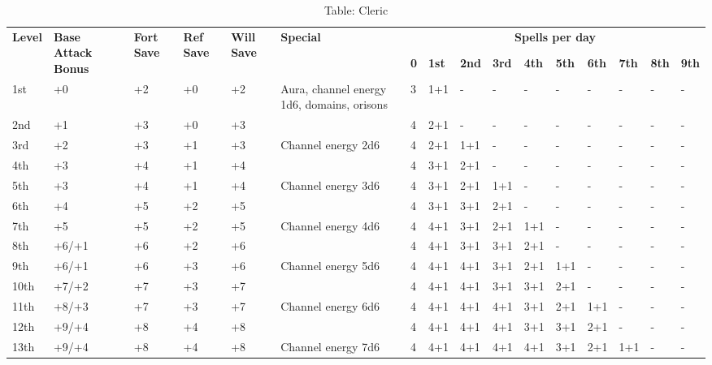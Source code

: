 \begin{table*}[]
\caption{Table: Cleric}
\sffamily
\setlength{\tabcolsep}{1pt}
\begin{tabularx}{\linewidth}{lp{6em}p{2.5em}p{2.5em}p{2.5em}Xllllllllll}
\multirow{2}{*}{\textbf{Level}} & \multirow{2}{*}{\parbox{5em}{\textbf{Base Attack Bonus}}} & \multirow{2}{*}{\parbox{1.5em}{\textbf{Fort Save}}} & \multirow{2}{*}{\parbox{1.5em}{\textbf{Ref Save}}} & \multirow{2}{*}{\parbox{1.5em}{\textbf{Will Save}}} & \textbf{Special} & \multicolumn{10}{c}{\textbf{Spells per day}} \\
                       &                                    &                            &                           &                            &                                                                                                  &  \textbf{0} & \textbf{1st} & \textbf{2nd} & \textbf{3rd} & \textbf{4th} & \textbf{5th} & \textbf{6th} & \textbf{7th} & \textbf{8th} & \textbf{9th} \\
1st & +0 & +2 & +0 & +2 & Aura, channel energy 1d6, domains, orisons & 3 & 1+1 & - & - & - & - & - & - & - & -\\
2nd & +1 & +3 & +0 & +3 &  & 4 & 2+1 & - & - & - & - & - & - & - & -\\
3rd & +2 & +3 & +1 & +3 & Channel energy 2d6 & 4 & 2+1 & 1+1 & - & - & - & - & - & - & -\\
4th & +3 & +4 & +1 & +4 &  & 4 & 3+1 & 2+1 & - & - & - & - & - & - & -\\
5th & +3 & +4 & +1 & +4 & Channel energy 3d6 & 4 & 3+1 & 2+1 & 1+1 & - & - & - & - & - & -\\
6th & +4 & +5 & +2 & +5 &  & 4 & 3+1 & 3+1 & 2+1 & - & - & - & - & - & -\\
7th & +5 & +5 & +2 & +5 & Channel energy 4d6 & 4 & 4+1 & 3+1 & 2+1 & 1+1 & - & - & - & - & -\\
8th & +6/+1 & +6 & +2 & +6 &  & 4 & 4+1 & 3+1 & 3+1 & 2+1 & - & - & - & - & -\\
9th & +6/+1 & +6 & +3 & +6 & Channel energy 5d6 & 4 & 4+1 & 4+1 & 3+1 & 2+1 & 1+1 & - & - & - & -\\
10th & +7/+2 & +7 & +3 & +7 &  & 4 & 4+1 & 4+1 & 3+1 & 3+1 & 2+1 & - & - & - & -\\
11th & +8/+3 & +7 & +3 & +7 & Channel energy 6d6 & 4 & 4+1 & 4+1 & 4+1 & 3+1 & 2+1 & 1+1 & - & - & -\\
12th & +9/+4 & +8 & +4 & +8 &  & 4 & 4+1 & 4+1 & 4+1 & 3+1 & 3+1 & 2+1 & - & - & -\\
13th & +9/+4 & +8 & +4 & +8 & Channel energy 7d6 & 4 & 4+1 & 4+1 & 4+1 & 4+1 & 3+1 & 2+1 & 1+1 & - & -\\

\end{tabularx}
\end{table*}
